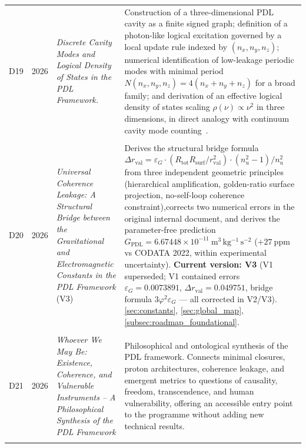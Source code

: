 \documentclass[11pt,a4paper]{article}
\begin{document}
\begin{longtable}{@{}llL{4cm}p{9.0cm}@{}}
D19 &
2026 &
\emph{Discrete Cavity Modes and Logical Density of States in the PDL Framework.}
 & Construction of a three-dimensional PDL cavity as a finite signed graph; definition of a photon-like logical excitation governed by a local update rule indexed by $(n_x,n_y,n_z)$; numerical identification of low-leakage periodic modes with minimal period $N(n_x,n_y,n_z)=4(n_x+n_y+n_z)$ for a broad family; and derivation of an effective logical density of states scaling $\rho(\nu)\propto \nu^2$ in three dimensions, in direct analogy with continuum cavity mode counting~\citep{PDLCavityModes2026}.\\\\[0.4em]

D20 & 
2026 &
\emph{Universal Coherence Leakage: A Structural Bridge between the Gravitational and Electromagnetic Constants in the PDL Framework} (V3) 
& Derives the structural bridge formula $\Delta r_{\mathrm{val}} = \varepsilon_G \cdot (R_{\mathrm{tot}} R_{\mathrm{surf}}/r_{\mathrm{val}}^2) \cdot (n_u^2-1)/n_u^2$ from three independent geometric principles (hierarchical amplification, golden-ratio surface projection, no-self-loop coherence constraint),corrects two numerical errors in the original internal document, and derives the parameter-free prediction $G_{\mathrm{PDL}} = 6.67448\times10^{-11}~\mathrm{m^3\,kg^{-1}\,s^{-2}}$ ($+27~\mathrm{ppm}$ vs CODATA 2022, within experimental uncertainty). \textbf{Current version: V3} (V1 superseded; V1 contained errors $\varepsilon_G = 0.0073891$, $\Delta r_{\mathrm{val}} = 0.049751$, bridge formula $3\varphi^2\varepsilon_G$ — all corrected in V2/V3). \citep{Universal_Coherence_Leakage_V3_2026} \ref{sec:constants}, \ref{sec:global_map}, \ref{subsec:roadmap_foundational}.\\\\[0.4em]

D21 & 2026 & \textit{Whoever We May Be: Existence, Coherence, and Vulnerable Instruments -- A Philosophical Synthesis of the PDL Framework} &
Philosophical and ontological synthesis of the PDL framework. Connects minimal closures, proton architectures, coherence leakage, and emergent metrics to questions of causality, freedom, transcendence, and human vulnerability, offering an accessible entry point to the programme without adding new technical results.\citep{WhoeverWeMayBe2026} \\\\[0.5em]


\end{longtable}
\end{document}
